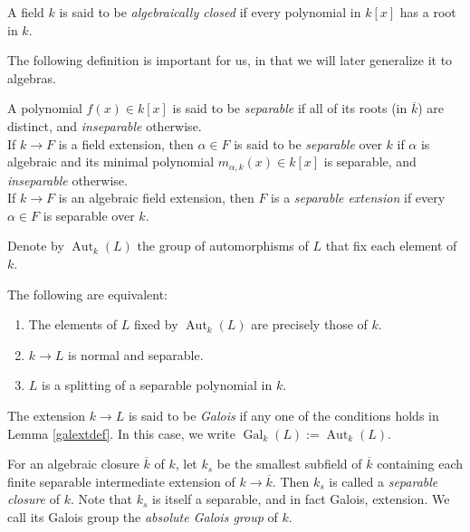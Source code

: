 \documentclass[11pt,openany]{book} %
\newcommand{\Aut}{\operatorname{Aut}}
\begin{document}
\begin{definition}
A field $k$ is said to be \emph{algebraically closed} if every polynomial in $k[x]$ has a root in $k$.
\end{definition}

The following definition is important for us, in that we will later generalize it to algebras.

\begin{definition}
A polynomial $f(x) \in k[x]$ is said to be \emph{separable} if all of its roots (in $\overline{k}$) are distinct, and \emph{inseparable} otherwise.\\

If $k \to F$ is a field extension, then $\alpha \in F$ is said to be \emph{separable} over $k$ if $\alpha$ is algebraic and its minimal polynomial $m_{\alpha,k}(x) \in k[x]$ is separable, and \emph{inseparable} otherwise.\\

If $k \to F$ is an algebraic field extension, then $F$ is a \emph{separable extension} if every $\alpha \in F$ is separable over $k$.
\end{definition}

Denote by $\Aut_k(L)$ the group of automorphisms of $L$ that fix each element of $k$.\\

\begin{lemma} \label{galextdef}
The following are equivalent:
\begin{enumerate}
	\item The elements of $L$ fixed by $\Aut_k(L)$ are precisely those of $k$.
    \item $k \to L$ is normal and separable.
    \item $L$ is a splitting of a separable polynomial in $k$.
\end{enumerate}
\end{lemma}
\medskip

\begin{definition}
The extension $k \to L$ is said to be \emph{Galois} if any one of the conditions holds in Lemma \ref{galextdef}.
In this case, we write $\operatorname{Gal}_k(L) := \Aut_k(L)$.
\end{definition}

\begin{definition}
For an algebraic closure $\overline{k}$ of $k$, let $k_s$ be the smallest subfield of $\overline{k}$ containing each finite separable intermediate extension of $k \to \overline{k}$. Then $k_s$ is called a \emph{separable closure} of $k$. Note that $k_s$ is itself a separable, and in fact Galois, extension. We call its Galois group the \emph{absolute Galois group} of $k$.
\end{definition}
\end{document}
